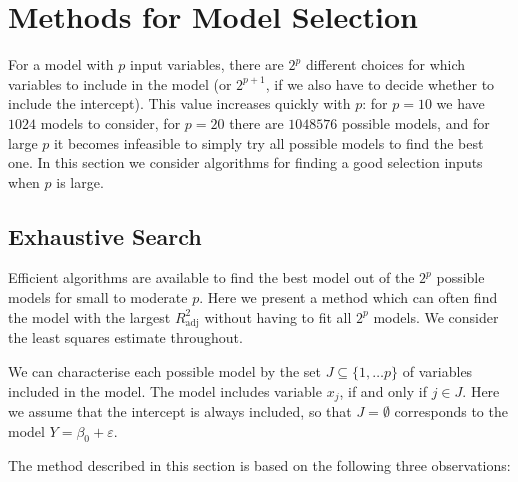 \documentclass[
  a4paper,
]{article}
\theoremstyle{definition}
\theoremstyle{definition}
\theoremstyle{definition}
\theoremstyle{definition}
\theoremstyle{remark}
\begin{document}
\clearpage

\hypertarget{S14-methods}{%
\section{Methods for Model Selection}\label{S14-methods}}

For a model with \(p\) input variables, there are
\(2^p\) different choices for which variables to include in the
model (or \(2^{p+1}\), if we also have to decide whether to include the intercept).
This value increases quickly with \(p\): for \(p = 10\) we
have \(1024\) models to consider, for \(p = 20\) there are \(1048576\) possible
models, and for large \(p\) it becomes infeasible to simply try all possible
models to find the best one. In this section we consider algorithms
for finding a good selection inputs when \(p\) is large.

\hypertarget{exhaustive-search}{%
\subsection{Exhaustive Search}\label{exhaustive-search}}

Efficient algorithms are available to find the best model out of the
\(2^p\) possible models for small to moderate \(p\). Here we present
a method which can often find the model with the largest \(R^2_\mathrm{adj}\)
without having to fit all \(2^p\) models. We consider the least squares
estimate throughout.

We can characterise each possible model by the set \(J \subseteq \{1, \ldots p\}\) of variables included in the model. The model includes variable \(x_j\), if
and only if \(j \in J\). Here we assume that the intercept is always included,
so that \(J=\emptyset\) corresponds to the model \(Y = \beta_0 + \varepsilon\).

The method described in this section is based on the following three observations:
\end{document}
